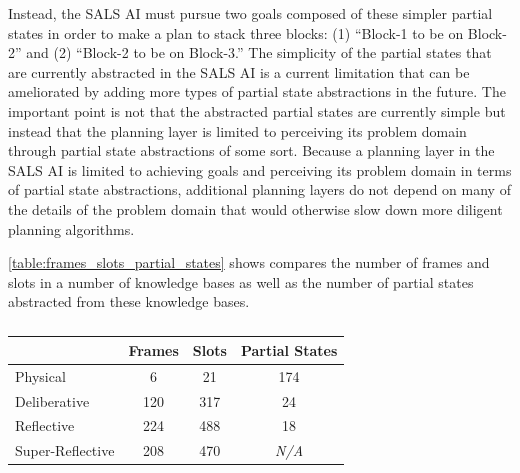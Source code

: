 Instead, the SALS AI must pursue two goals composed of these simpler
partial states in order to make a plan to stack three blocks: (1)
``Block-1 to be on Block-2'' and (2) ``Block-2 to be on Block-3.''
The simplicity of the partial states that are currently abstracted in
the SALS AI is a current limitation that can be ameliorated by adding
more types of partial state abstractions in the future.  The important
point is not that the abstracted partial states are currently simple
but instead that the planning layer is limited to perceiving its
problem domain through partial state abstractions of some sort.
Because a planning layer in the SALS AI is limited to achieving goals
and perceiving its problem domain in terms of partial state
abstractions, additional planning layers do not depend on many of the
details of the problem domain that would otherwise slow down more
diligent planning algorithms.

{\mbox{\autoref{table:frames_slots_partial_states}}} shows compares
the number of frames and slots in a number of knowledge bases as well
as the number of partial states abstracted from these knowledge bases.
\begin{table}
\centering
\begin{tabular}{|l|c|c|c|}
\hline
                 & Frames  & Slots & Partial States  \\
\hline
Physical         & 6       & 21    & 174             \\
\hline
Deliberative     & 120     & 317   & 24              \\
\hline
Reflective       & 224     & 488   & 18              \\
\hline
Super-Reflective & 208     & 470   & {\scriptsize{\emph{N/A}}}      \\
\hline
\end{tabular}
\caption{}
\label{table:frames_slots_partial_states}
\end{table}

